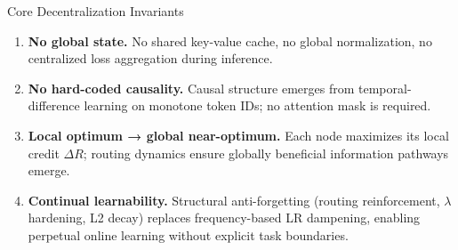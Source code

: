 \documentclass[11pt,a4paper]{article}
\theoremstyle{definition}
\begin{document}
\begin{designbox}{Core Decentralization Invariants}
  \begin{enumerate}[itemsep=0pt]
    \item \textbf{No global state.} No shared key-value cache, no global normalization,
      no centralized loss aggregation during inference.
    \item \textbf{No hard-coded causality.} Causal structure emerges from temporal-difference
      learning on monotone token IDs; no attention mask is required.
    \item \textbf{Local optimum → global near-optimum.} Each node maximizes its local
      credit $\Delta R$; routing dynamics ensure globally beneficial information pathways emerge.
    \item \textbf{Continual learnability.} Structural anti-forgetting (routing reinforcement,
      $\lambda$ hardening, L2 decay) replaces frequency-based LR dampening,
      enabling perpetual online learning without explicit task boundaries.
  \end{enumerate}
\end{designbox}
\end{document}
